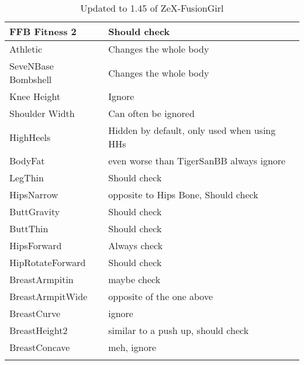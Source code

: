 \begin{longtable}{| p{} | p{} |}
    FFB Fitness 2 & Should check \\ \hline
    Athletic & Changes the whole body \\ \hline
    SeveNBase Bombshell & Changes the whole body \\ \hline
    Knee Height & Ignore \\ \hline
    Shoulder Width & Can often be ignored \\ \hline
    HighHeels & Hidden by default, only used when using HHs \\ \hline
    BodyFat & even worse than TigerSanBB always ignore \\ \hline
    LegThin & Should check \\ \hline
    HipsNarrow & opposite to Hips Bone, Should check \\ \hline
    ButtGravity & Should check \\ \hline
    ButtThin & Should check \\ \hline
    HipsForward & Always check \\ \hline
    HipRotateForward & Should check \\ \hline
    BreastArmpitin & maybe check \\ \hline
    BreastArmpitWide & opposite of the one above \\ \hline
    BreastCurve & ignore \\ \hline
    BreastHeight2 & similar to a push up, should check \\ \hline
    BreastConcave & meh, ignore \\ \hline
    \caption{Updated to 1.45 of ZeX-FusionGirl}
\end{longtable}